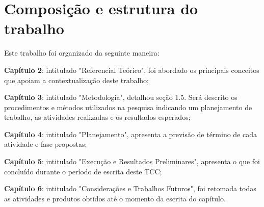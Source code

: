 

\section{Composição e estrutura do trabalho}
Este trabalho foi organizado da seguinte maneira:

\textbf{Capítulo 2}: intitulado "Referencial Teórico", foi abordado os principais conceitos que apoiam a contextualização deste trabalho;

\textbf{Capítulo 3}: intitulado "Metodologia", detalhou seção 1.5. Será descrito os procedimentos e métodos utilizados na pesquisa indicando um planejamento de trabalho, as atividades realizadas e os resultados esperados;

\textbf{Capítulo 4}: intitulado "Planejamento", apresenta a previsão de término de cada atividade e fase propostas;

\textbf{Capítulo 5}: intitulado "Execução e Resultados Preliminares", apresenta o que foi concluído durante o período de escrita deste TCC;

\textbf{Capítulo 6}: intitulado "Considerações e Trabalhos Futuros", foi retomada todas as atividades e produtos obtidos até o momento da escrita do capítulo.